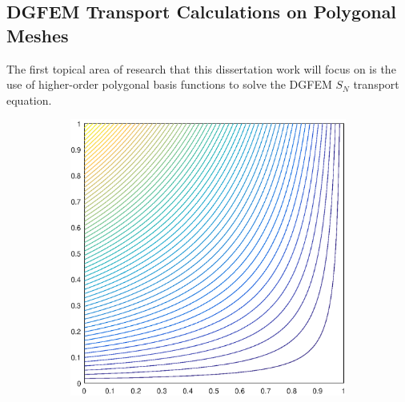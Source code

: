 \documentclass[11pt]{article}
\begin{document}
\subsection{DGFEM Transport Calculations on Polygonal Meshes}
\label{sec::CW_poly}

The first topical area of research that this dissertation work will focus on is the use of higher-order polygonal basis functions to solve the DGFEM $S_N$ transport equation. 

\begin{figure}
\label{fig::2D_Linear_Summary_unit_square_basis_functions}
\centering
	\begin{subfigure}[b]{0.225\textwidth}
		\centering
		\includegraphics[width=\textwidth]{figures/square_WACHSPRESS1_contour_b4.eps}
		\caption{}
	\end{subfigure}
	\hspace{1cm}
	\begin{subfigure}[b]{0.225\textwidth}
		\centering

\end{subfigure}
\end{figure}
\end{document}
